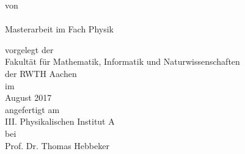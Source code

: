 
\makeatletter
\begin{titlepage}
		\tgherosfont
		\centering
		
		\Large
		
		\vspace*{\fill}
		
		{
            \color{ctcolormain}
            \fontsize{30}{32}\selectfont
            \bfseries
            \@title
            \par
		}
		
		\vspace{24mm}
		
		\textsf{von} \\
		{\LARGE \@author} \\[32mm]
		
		Masterarbeit im Fach Physik \\[8mm]
		
		\large
		
		\textsf{vorgelegt der} \\
		Fakultät für Mathematik, Informatik und Naturwissenschaften \\der RWTH Aachen \\[8mm]
		
		\textsf{im} \\
		August 2017 \\[8mm]
		
		\textsf{angefertigt am} \\
		III. Physikalischen Institut A \\[8mm]
		
		\textsf{bei} \\
		Prof. Dr. Thomas Hebbeker \\
\end{titlepage}
\makeatother